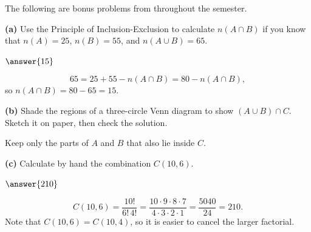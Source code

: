 \documentclass[12pt]{ximera}
\begin{document}
\begin{problem}
The following are bonus problems from throughout the semester.

\begin{prompt}
\textbf{(a)} Use the Principle of Inclusion-Exclusion to calculate $n(A\cap B)$ if
you know that $n(A)=25$, $n(B)=55$, and $n(A\cup B)=65$.

$\answer{15}$

\begin{feedback}
\[ 65 = 25 + 55 - n(A\cap B) = 80 - n(A\cap B), \]
so $n(A\cap B)=80-65=15$.
\end{feedback}
\end{prompt}

\begin{prompt}
\textbf{(b)} Shade the regions of a three-circle Venn diagram to show
$(A\cup B)\cap C$. Sketch it on paper, then check the solution.

\begin{freeResponse}
\end{freeResponse}

\begin{feedback}
Keep only the parts of $A$ and $B$ that also lie inside $C$.
\begin{center}
\end{center}
\end{feedback}
\end{prompt}

\begin{prompt}
\textbf{(c)} Calculate by hand the combination $C(10,6)$.

$\answer{210}$

\begin{feedback}
\[
C(10,6)=\frac{10!}{6!\,4!}
=\frac{10\cdot 9\cdot 8\cdot 7}{4\cdot 3\cdot 2\cdot 1}
=\frac{5040}{24}=210.
\]
Note that $C(10,6)=C(10,4)$, so it is easier to cancel the larger factorial.
\end{feedback}
\end{prompt}


\end{problem}
\end{document}
